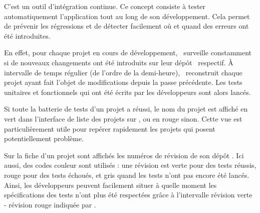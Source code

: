 C'est un outil d'intégration continue. Ce concept consiste à tester automatiquement l'application tout au long de son développement. Cela permet de prévenir les régressions et de détecter facilement où et quand des erreurs ont été introduites.

En effet, pour chaque projet en cours de développement, \asismo\ surveille constamment si de nouveaux changements ont été introduits sur leur dépôt \asvn\ respectif. À intervalle de temps régulier (de l'ordre de la demi-heure), \asismo\ reconstruit chaque projet ayant fait l'objet de modifications depuis la passe précédente. Les tests unitaires et fonctionnels qui ont été écrits par les développeurs sont alors lancés.

Si toute la batterie de tests d'un projet a réussi, le nom du projet est affiché en vert dans l'interface de liste des projets sur \asismo, ou en rouge sinon. Cette vue est particulièrement utile pour repérer rapidement les projets qui posent potentiellement problème.

Sur la fiche d'un projet sont affichés les numéros de révision de son dépôt \asvn. Ici aussi, des codes couleur sont utilisés : une révision est verte pour des tests réussis, rouge pour des tests échoués, et gris quand les tests n'ont pas encore été lancés. Ainsi, les développeurs peuvent facilement situer à quelle moment les spécifications des tests n'ont plus été respectées grâce à l'intervalle révision verte - révision rouge indiquée par \asismo.
